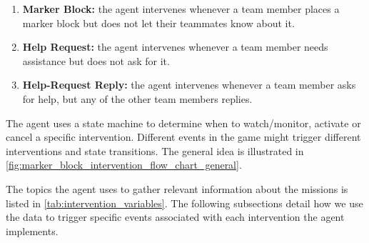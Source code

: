 \begin{enumerate}

    \item \textbf{Marker Block:} the agent intervenes whenever a team member
        places a marker block but does not let their teammates know about it.

    \item \textbf{Help Request:} the agent intervenes whenever a team member
        needs assistance but does not ask for it.

    \item \textbf{Help-Request Reply:} the agent intervenes whenever a team
        member asks for help, but any of the other team members replies.

\end{enumerate}

The agent uses a state machine to determine when to watch/monitor, activate or
cancel a specific intervention. Different events in the game might trigger
different interventions and state transitions. The general idea is illustrated
in \autoref{fig:marker_block_intervention_flow_chart_general}.  

The topics the agent uses to gather relevant information about the missions is listed in \autoref{tab:intervention_variables}.
The following subsections detail how we use the data to trigger specific events associated with each intervention the agent implements.

